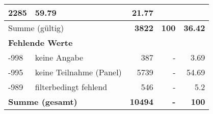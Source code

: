 \begin{longtable}{lXrrr}
       \num{2285} &
       \num[round-mode=places,round-precision=2]{59.79} &
         \num[round-mode=places,round-precision=2]{21.77} \\
     \midrule
     \multicolumn{2}{l}{Summe (gültig)} &
       \textbf{\num{3822}} &
     \textbf{\num{100}} &
       \textbf{\num[round-mode=places,round-precision=2]{36.42}} \\
     \multicolumn{5}{l}{\textbf{Fehlende Werte}}\\
       -998 &
       keine Angabe &
         \num{387} &
        - &
         \num[round-mode=places,round-precision=2]{3.69} \\
       -995 &
       keine Teilnahme (Panel) &
         \num{5739} &
        - &
         \num[round-mode=places,round-precision=2]{54.69} \\
       -989 &
       filterbedingt fehlend &
         \num{546} &
        - &
         \num[round-mode=places,round-precision=2]{5.2} \\
     \midrule
     \multicolumn{2}{l}{\textbf{Summe (gesamt)}} &
          \textbf{\num{10494}} &
        \textbf{-} &
        \textbf{\num{100}} \\
     \bottomrule
     \end{longtable}
     
